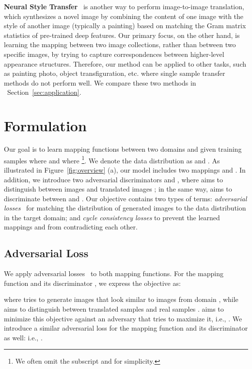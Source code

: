 \documentclass[10pt,twocolumn,letterpaper]{article}
\newcommand{\reffig}[1]{Figure~\ref{fig:#1}}
\newcommand{\refsec}[1]{Section~\ref{sec:#1}}
\newcommand{\lblsec}[1]{\label{sec:#1}}
\begin{document}
{\bf Neural Style Transfer}~\cite{gatys2015neural,johnson2016perceptual,ulyanov2016texture,gatys2016preserving} is another way to perform image-to-image translation, which synthesizes a novel image by combining the content of one image with the style of another image (typically a painting) based on matching the Gram matrix statistics of pre-trained deep features.  Our primary focus, on the other hand, is learning the mapping between two image collections, rather than between two specific images, by trying to capture correspondences between higher-level appearance structures. Therefore, our method can be applied to other tasks, such as painting photo, object transfiguration, etc. where single sample transfer methods do not perform well. We compare these two methods in ~\refsec{application}.
     

\section{Formulation}
\lblsec{method}


Our goal is to learn mapping functions between two domains  and  given training samples  where  and  where \footnote{We often omit the subscript  and  for simplicity.}. We denote the data distribution as  and . As illustrated in \reffig{overview} (a), our model includes two mappings  and . In addition, we introduce two adversarial discriminators  and , where  aims to distinguish between images  and translated images ; in the same way,  aims to discriminate between  and . Our objective contains two types of terms: \textit{adversarial losses}~\cite{goodfellow2014generative} for matching the distribution of generated images to the data distribution in the target domain; and \textit{cycle consistency losses} to prevent the learned mappings  and  from contradicting each other.

\subsection{Adversarial Loss}
We apply adversarial losses~\cite{goodfellow2014generative} to both mapping functions. For the mapping function  and its discriminator , we express the objective as: 

where  tries to generate images  that look similar to images from domain , while  aims to distinguish between translated samples  and real samples .  aims to minimize this objective against an adversary  that tries to maximize it, i.e., .
We introduce a similar adversarial loss for the mapping function  and its discriminator  as well: i.e., .
\end{document}

